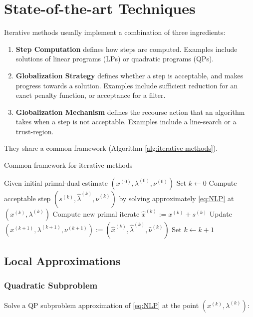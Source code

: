 \section{State-of-the-art Techniques}

Iterative methods usually implement a combination of three ingredients:

\begin{enumerate}
\item \textbf{Step Computation} defines how steps are computed. Examples include solutions
of linear programs (LPs) or quadratic programs (QPs).
\item \textbf{Globalization Strategy} defines whether a step is acceptable, and makes progress towards
a solution. Examples include sufficient reduction for an exact penalty function, or
acceptance for a filter.
\item \textbf{Globalization Mechanism} defines the recourse action that an algorithm takes when a step
is not acceptable. Examples include a line-search or a trust-region.
\end{enumerate}

They share a common framework (Algorithm \ref{alg:iterative-methods}).

\medskip
\begin{algorithm}[H]
\medskip
\caption{Common framework for iterative methods}
\label{alg:iterative-methods}
Given initial primal-dual estimate $(x^{(0)}, \lambda^{(0)}, \nu^{(0)})$ \;
Set $k \gets 0$ \;
 {
	Compute acceptable step $(s^{(k)}, \hat{\lambda}^{(k)}, \hat{\nu}^{(k)})$ by solving approximately \eqref{eq:NLP} at $(x^{(k)}, \lambda^{(k)})$ \;
	Compute new primal iterate $\hat{x}^{(k)} := x^{(k)} + s^{(k)}$ \;
	Update $(x^{(k+1)}, \lambda^{(k+1)}, \nu^{(k+1)}) := (\hat{x}^{(k)}, \hat{\lambda}^{(k)}, \hat{\nu}^{(k)})$ \;
	Set $k \gets k+1$ \;
}
\end{algorithm}
\medskip

\subsection{Local Approximations}

\subsubsection{Quadratic Subproblem}

Solve a QP subproblem approximation of \eqref{eq:NLP} at the point $(x^{(k)}, \lambda^{(k)})$:

